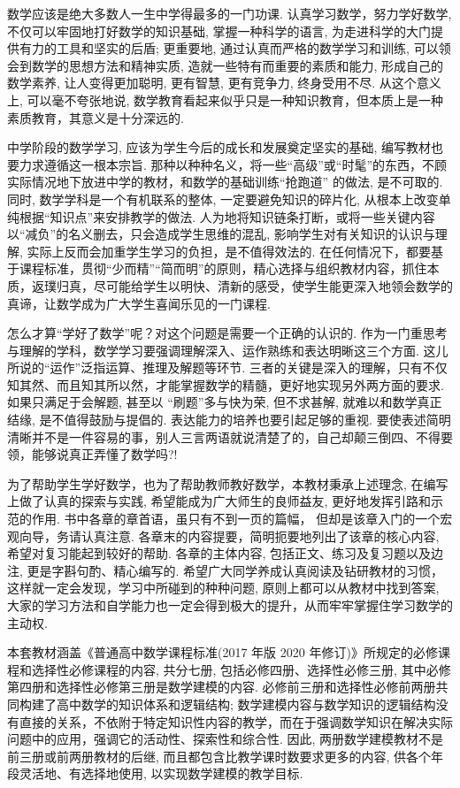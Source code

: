 \documentclass[10pt]{article}
\begin{document}
数学应该是绝大多数人一生中学得最多的一门功课. 认真学习数学，努力学好数学, 不仅可以牢固地打好数学的知识基础, 掌握一种科学的语言, 为走进科学的大门提供有力的工具和坚实的后盾; 更重要地, 通过认真而严格的数学学习和训练, 可以领会到数学的思想方法和精神实质, 造就一些特有而重要的素质和能力, 形成自己的数学素养, 让人变得更加聪明, 更有智慧, 更有竞争力, 终身受用不尽. 从这个意义上, 可以毫不夸张地说, 数学教育看起来似乎只是一种知识教育，但本质上是一种素质教育，其意义是十分深远的.

中学阶段的数学学习, 应该为学生今后的成长和发展奠定坚实的基础, 编写教材也要力求遵循这一根本宗旨. 那种以种种名义，将一些“高级”或“时髦”的东西，不顾实际情况地下放进中学的教材，和数学的基础训练“抢跑道” 的做法, 是不可取的. 同时, 数学学科是一个有机联系的整体, 一定要避免知识的碎片化, 从根本上改变单纯根据“知识点”来安排教学的做法. 人为地将知识链条打断，或将一些关键内容以“减负”的名义删去，只会造成学生思维的混乱, 影响学生对有关知识的认识与理解, 实际上反而会加重学生学习的负担，是不值得效法的. 在任何情况下，都要基于课程标准，贯彻“少而精”“简而明”的原则，精心选择与组织教材内容，抓住本质，返璞归真，尽可能给学生以明快、清新的感受，使学生能更深入地领会数学的真谛，让数学成为广大学生喜闻乐见的一门课程.

怎么才算“学好了数学”呢？对这个问题是需要一个正确的认识的. 作为一门重思考与理解的学科，数学学习要强调理解深入、运作熟练和表达明晰这三个方面. 这儿所说的“运作”泛指运算、推理及解题等环节. 三者的关键是深入的理解，只有不仅知其然、而且知其所以然，才能掌握数学的精髓，更好地实现另外两方面的要求. 如果只满足于会解题, 甚至以 “刷题”多与快为荣, 但不求甚解, 就难以和数学真正结缘, 是不值得鼓励与提倡的. 表达能力的培养也要引起足够的重视. 要使表述简明清晰并不是一件容易的事，别人三言两语就说清楚了的，自己却颠三倒四、不得要领，能够说真正弄懂了数学吗?!

为了帮助学生学好数学，也为了帮助教师教好数学，本教材秉承上述理念, 在编写上做了认真的探索与实践, 希望能成为广大师生的良师益友, 更好地发挥引路和示范的作用. 书中各章的章首语，虽只有不到一页的篇幅， 但却是该章入门的一个宏观向导，务请认真注意. 各章末的内容提要，简明扼要地列出了该章的核心内容, 希望对复习能起到较好的帮助. 各章的主体内容, 包括正文、练习及复习题以及边注, 更是字斟句酌、精心编写的. 希望广大同学养成认真阅读及钻研教材的习惯，这样就一定会发现，学习中所碰到的种种问题, 原则上都可以从教材中找到答案, 大家的学习方法和自学能力也一定会得到极大的提升，从而牢牢掌握住学习数学的主动权.

本套教材涵盖《普通高中数学课程标准(2017 年版 2020 年修订)》所规定的必修课程和选择性必修课程的内容, 共分七册, 包括必修四册、选择性必修三册, 其中必修第四册和选择性必修第三册是数学建模的内容. 必修前三册和选择性必修前两册共同构建了高中数学的知识体系和逻辑结构; 数学建模内容与数学知识的逻辑结构没有直接的关系，不依附于特定知识性内容的教学，而在于强调数学知识在解决实际问题中的应用，强调它的活动性、探索性和综合性. 因此, 两册数学建模教材不是前三册或前两册教材的后继, 而且都包含比教学课时数要求更多的内容, 供各个年段灵活地、有选择地使用, 以实现数学建模的教学目标.
\end{document}
